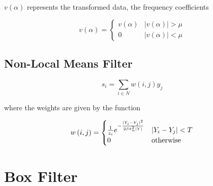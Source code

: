 \documentclass[11pt]{article}
\theoremstyle{definition}
\begin{document}
$v\left(\alpha\right)$ represents the transformed data, the frequency coefficients

\begin{displaymath}
v\left(\alpha\right) = 
\begin{cases}
v\left(\alpha\right) & \lvert v\left(\alpha\right)\rvert > \mu \\
0 & \lvert v\left(\alpha\right)\rvert < \mu
\end{cases}
\end{displaymath}


\subsection{Non-Local Means Filter}

\begin{displaymath}
s_i = \sum _{i \in N} w \left(i, j \right) y_j
\end{displaymath}

\noindent
where the weights are given by the function

\begin{displaymath}
w\left(i, j\right) = 
\begin{cases}
\frac{1}{z_i} e^{-\frac{\lvert Y_i - Y_j \rvert ^2}{2 \beta \hat{\sigma}^2_n \lvert Y \rvert}} & \lvert Y_i - Y_j \rvert < T \\
0 & $otherwise$
\end{cases}
\end{displaymath}


\pagebreak


\section{Box Filter}
\end{document}
